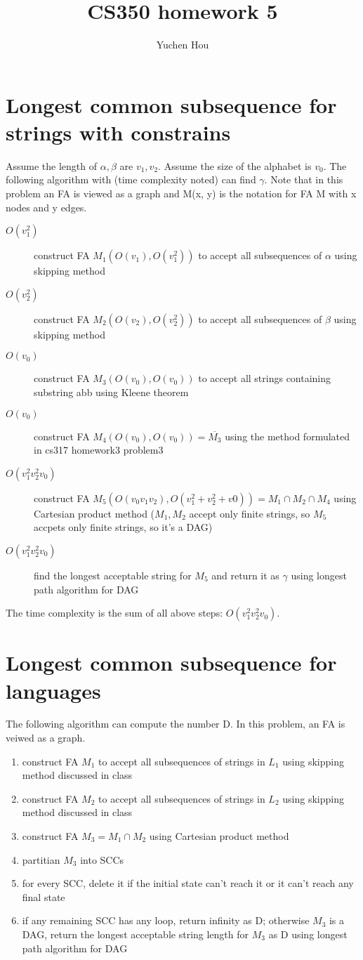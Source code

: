 \documentclass{article}
\begin{document}
\lstset{language=Java}
\title{CS350 homework 5}
\author{Yuchen Hou}
\maketitle
\section{Longest common subsequence for strings with constrains}
Assume the length of $\alpha, \beta$ are $v_1, v_2$. Assume the size of
the alphabet is $v_0$. The following algorithm with (time complexity noted) can
find $\gamma$. Note that in this problem an FA is viewed as a graph and M(x, y)
is the notation for FA M with x nodes and y edges.
\begin{description}
  \item[$O(v_1^2)$] construct FA $M_1(O(v_1), O(v_1^2))$ to accept all
  subsequences of $\alpha$ using skipping method
  \item[$O(v_2^2)$] construct FA $M_2(O(v_2), O(v_2^2))$ to accept all
  subsequences of $\beta$ using skipping method
  \item[$O(v_0)$] construct FA $M_3(O(v_0), O(v_0))$ to accept all strings
  containing substring abb using Kleene theorem
  \item[$O(v_0)$] construct FA $M_4(O(v_0), O(v_0)) = \overline{M_3}$ using
  the method formulated in cs317 homework3 problem3
  \item[$O(v_1^2v_2^2v_0)$] construct FA $M_5(O(v_0v_1v_2), O(v_1^2 + v_2^2 +
  v0)) = M_1 \cap M_2 \cap M_4$ using Cartesian product method ($M_1, M_2$
  accept only finite strings, so $M_5$ accpets only finite strings, so it's a
  DAG)
  \item[$O(v_1^2v_2^2v_0)$] find the longest acceptable string for $M_5$ and
  return it as $\gamma$ using longest path algorithm for DAG
\end{description}
The time complexity is the sum of all above steps: $O(v_1^2v_2^2v_0)$.
\section{Longest common subsequence for languages}
The following algorithm can compute the number D. In this problem, an FA is
veiwed as a graph.
\begin{enumerate}
  \item construct FA $M_1$ to accept all subsequences of strings in $L_1$ using
  skipping method discussed in class
  \item construct FA $M_2$ to accept all subsequences of strings in $L_2$ using
  skipping method discussed in class
  \item construct FA $M_3  = M_1 \cap M_2$ using Cartesian product method
  \item partitian $M_3$ into SCCs
  \item for every SCC, delete it if the initial state can't reach it or it can't
  reach any final state
  \item if any remaining SCC has any loop, return infinity as D; otherwise $M_3$
  is a DAG, return the longest acceptable string length for $M_3$ as D using
  longest path algorithm for DAG
\end{enumerate}
\end{document}
